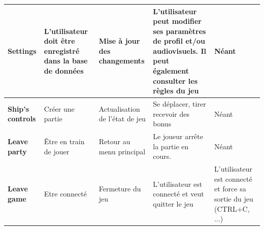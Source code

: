 \documentclass[a4paper,12pt]{article}
\begin{document}
\begin{center}
\begin{longtable}{|p{}||p{}|p{}|p{}|p{}|}
\hline
\hline
\textbf{Settings}     & L'utilisateur doit être enregistré dans la base de données   & Mise à jour des changements  & L'utilisateur peut modifier ses paramètres de profil et/ou audiovisuels. Il peut également consulter les règles du jeu  & Néant\\
\hline
\hline
\textbf{Ship’s controls}  & Créer une partie  & Actualisation de l’état de jeu  & Se déplacer, tirer recevoir des bonus  & Néant\\
\hline
\hline
\textbf{Leave party}      & Être en train de jouer   & Retour au menu principal  & Le joueur arrête la partie en cours.  & Néant\\
\hline
\hline
\hline
\hline
\textbf{Leave game}      & Etre connecté   & Fermeture du jeu  & L'utilisateur est connecté et veut quitter le jeu  & L'utilisateur est connecté et force sa sortie du jeu (CTRL+C, ...)\\
\hline
\end{longtable}
\end{center}
\end{document}
